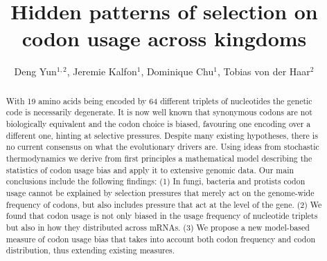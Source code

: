 \documentclass[a4paper,10pt]{paper}%
\begin{document}
\title{Hidden patterns of selection on codon usage across kingdoms}

\author{%
Deng Yun$^{1,2}$, Jeremie Kalfon$^1$,  Dominique Chu$^1$, Tobias von der Haar$^2$}





\maketitle

\begin{abstract}
With 19 amino acids being encoded by 64 different triplets of nucleotides   the genetic code is necessarily degenerate. It is now well known that synonymous codons are not biologically equivalent and the codon choice is biased, favouring one encoding over a different one, hinting at selective  pressures. Despite many existing hypotheses, there is no current consensus on what the evolutionary drivers are.  Using ideas from stochastic thermodynamics we derive from first principles a mathematical model describing the statistics of codon usage bias and apply it to extensive genomic data. Our main conclusions include the following findings: (1)  In fungi, bacteria and protists codon usage cannot be explained by selection pressures  that merely act on the genome-wide frequency of codons, but also includes pressure that act at the level of the gene. (2) We found that codon usage is not only biased in  the usage frequency of nucleotide triplets but also in how they  distributed across mRNAs. (3) We propose a new model-based  measure of codon usage bias that takes into account both codon frequency and codon distribution, thus extending existing measures.  
\end{abstract}
\end{document}
